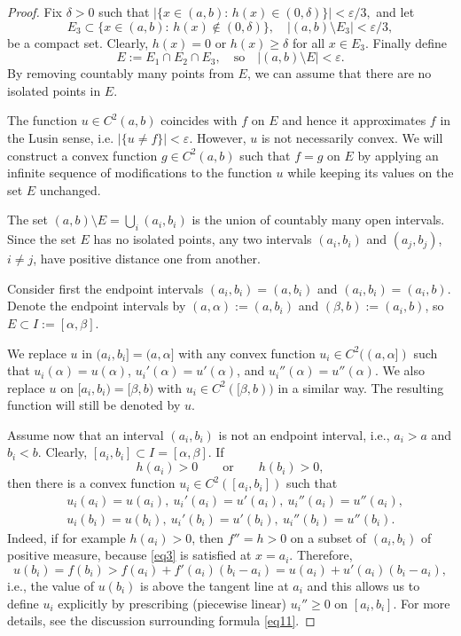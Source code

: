 \documentclass[intlimits,12pt,reqno]{amsart}
\newcommand{\eps}{\varepsilon}
\theoremstyle{definition}
\begin{document}
\begin{proof}
Fix $\delta>0$ such that
$
|\{x\in (a,b):\, h(x)\in (0,\delta)\}|<\eps/3,
$
and let
$$
E_3\subset \{x\in (a,b):\, h(x)\not\in (0,\delta)\},
\quad
|(a,b)\setminus E_3|<\eps/3,
$$
be a compact set. Clearly, $h(x)=0$ or $h(x)\geq \delta$ for all $x\in E_3$. Finally define
$$
E:=E_1\cap E_2\cap E_3,
\quad
\text{so}
\quad
|(a,b)\setminus E|<\eps.
$$
By removing countably many points from $E$, we can assume that there are no isolated points in $E$.

The function $u\in C^2(a,b)$ coincides with $f$ on $E$ and hence it approximates $f$ in the Lusin sense, i.e. $|\{u\neq f\}|<\eps$. However, $u$ is not necessarily convex. We will
construct a convex function $g\in C^2(a,b)$ such that $f=g$ on $E$ by applying an infinite  sequence of modifications to the function $u$ while keeping its values on the set $E$ unchanged.

The set $(a,b)\setminus E=\bigcup_i (a_i,b_i)$ is the union of countably many open intervals.
Since the set $E$ has no isolated points, any two intervals $(a_i,b_i)$ and $(a_j,b_j)$, $i\neq j$, have positive distance one from another.

Consider first the endpoint intervals $(a_i,b_i)=(a,b_i)$ and $(a_i,b_i)=(a_i,b)$.
Denote the endpoint intervals by $(a,\alpha):=(a,b_i)$ and $(\beta,b):=(a_i,b)$, so $E\subset I:=[\alpha,\beta]$.


We replace $u$ in $(a_i,b_i]=(a,\alpha]$ with any convex function $u_i\in C^2((a,\alpha])$ such that $u_i(\alpha)=u(\alpha)$, $u_i'(\alpha)=u'(\alpha)$, and $u_i''(\alpha)=u''(\alpha)$. We also replace $u$ on $[a_i,b_i)=[\beta,b)$ with $u_i\in C^2([\beta,b))$ in a similar way.
The resulting function will still be denoted by $u$.

Assume now that an interval $(a_i,b_i)$ is not an endpoint interval, i.e., $a_i>a$ and $b_i<b$.
Clearly, $[a_i,b_i]\subset I=[\alpha,\beta]$.
If
\begin{equation}
\label{eq5}
h(a_i)>0
\qquad
\text{or}
\qquad
h(b_i)>0,
\end{equation}
then there is a convex function $u_i\in C^2([a_i,b_i])$ such that
\begin{equation}
\label{eq9}
\begin{aligned}
&u_i(a_i)=u(a_i),\ u_i'(a_i)=u'(a_i),\ u_i''(a_i)=u''(a_i),\\
&u_i(b_i)=u(b_i),\ u_i'(b_i)=u'(b_i),\ u_i''(b_i)=u''(b_i).
\end{aligned}
\end{equation}
Indeed, if for example $h(a_i)>0$, then $f''=h>0$ on a subset of $(a_i,b_i)$ of positive measure, because \eqref{eq3} is satisfied at $x=a_i$. Therefore,
$$
u(b_i)=f(b_i)>f(a_i)+f'(a_i)(b_i-a_i)=u(a_i)+u'(a_i)(b_i-a_i),
$$
i.e., the value of $u(b_i)$ is above the tangent line at $a_i$ and this allows us to define $u_i$ explicitly by prescribing (piecewise linear) $u_i''\geq 0$ on $[a_i,b_i]$. For more details, see the discussion surrounding formula \eqref{eq11}.


\end{proof}
\end{document}
